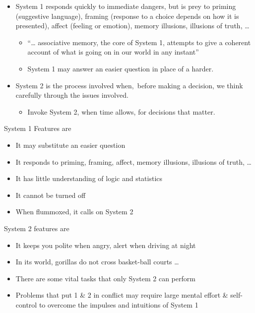 \documentclass[
  10pt,
  b5paper]{book}
\providecommand{\tightlist}{%
  \setlength{\itemsep}{0pt}\setlength{\parskip}{0pt}}
\begin{document}
\begin{itemize}
\tightlist
\item
  System 1 responds quickly to immediate dangers, but is prey to
  priming (suggestive language), framing (response to a choice
  depends on how it is presented), affect (feeling or emotion),
  memory illusions, illusions of truth, \ldots{}

  \begin{itemize}
  \tightlist
  \item
    ``\ldots{} associative memory, the core of System 1, attempts to give a coherent
    account of what is going on in our world in any instant''\\
  \item
    System 1 may answer an easier question in place of a harder.
  \end{itemize}
\item
  System 2 is the process involved when,~before making a decision,
  we think carefully through the issues involved.

  \begin{itemize}
  \tightlist
  \item
    Invoke System 2, when time allows, for decisions that matter.
  \end{itemize}
\end{itemize}

System 1 Features are

\begin{itemize}
\tightlist
\item
  It may substitute an easier question
\item
  It responds to priming, framing, affect, memory illusions,
  illusions of truth, \ldots{}
\item
  It has little understanding of logic and statistics
\item
  It cannot be turned off
\item
  When flummoxed, it calls on System 2
\end{itemize}

System 2 features are

\begin{itemize}
\tightlist
\item
  It keeps you polite when angry, alert when driving at night
\item
  In its world, gorillas do not cross basket-ball courts \ldots{}
\item
  There are some vital tasks that only System 2 can perform
\item
  Problems that put 1 \& 2 in conflict may require large
  mental effort \& self-control to overcome the impulses and
  intuitions of System 1
\end{itemize}
\end{document}
